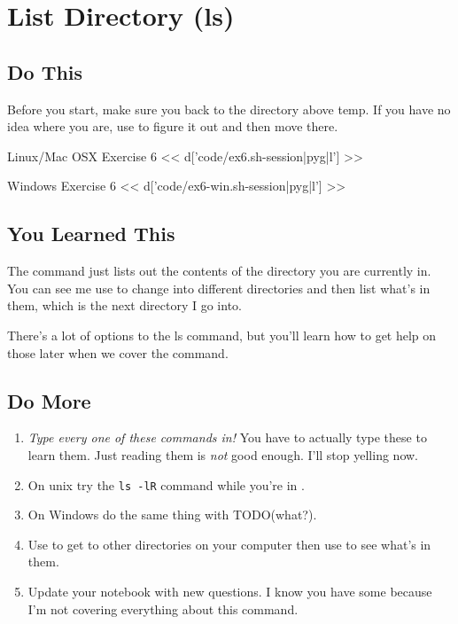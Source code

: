 \chapter{List Directory (ls)}

\section{Do This}

Before you start, make sure you  back to the directory above temp.
If you have no idea where you are, use  to figure it out and then
move there.

\begin{code}{Linux/Mac OSX Exercise 6}
<< d['code/ex6.sh-session|pyg|l'] >>
\end{code}

\begin{code}{Windows Exercise 6}
<< d['code/ex6-win.sh-session|pyg|l'] >>
\end{code}

\section{You Learned This}

The  command just lists out the contents of the directory you
are currently in.  You can see me use  to change into different
directories and then list what's in them, which is the next directory I
go into.

There's a lot of options to the ls command, but you'll learn how to get
help on those later when we cover the  command.

\section{Do More}

\begin{enumerate}
\item \emph{Type every one of these commands in!} You have to actually type these
    to learn them.  Just reading them is \emph{not} good enough.  I'll stop yelling
    now.
\item On unix try the \verb|ls -lR| command while you're in .
\item On Windows do the same thing with TODO(what?).
\item Use  to get to other directories on your computer then use  to see what's in them.
\item Update your notebook with new questions.  I know you have some because I'm
    not covering everything about this command.
\end{enumerate}

